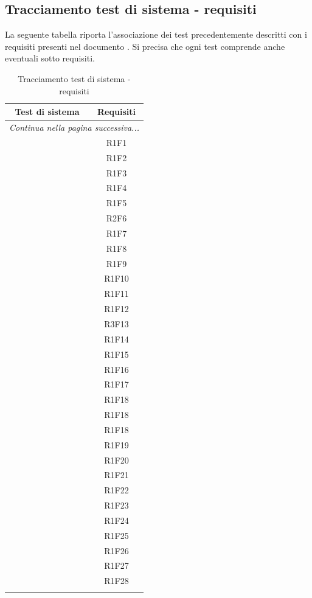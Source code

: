 \subsection{Tracciamento test di sistema - requisiti}
La seguente tabella riporta l'associazione dei test precedentemente descritti con i requisiti presenti nel documento . Si precisa che ogni test comprende anche eventuali sotto requisiti.
\resetCTS
\begin{center}
	\begin{longtable}{|c|c|}
	\hline
	\rowcolor{lighter-grayer}
	\textbf{Test di sistema} & \textbf{Requisiti} \\
	\hline
	\endfirsthead
	\hline
	\multicolumn{2}{|c|}{\textit{Continua nella pagina successiva...}} \\
	\hline
	\endfoot
	\endlastfoot

	\hline
	 & R1F1 \\
	 & R1F2 \\
	 & R1F3 \\
	 & R1F4 \\
	 & R1F5 \\
	 & R2F6 \\
	 & R1F7 \\
	 & R1F8 \\
	 & R1F9 \\
	 & R1F10 \\

	 & R1F11  \\
	 & R1F12 \\
	 & R3F13 \\
	 & R1F14 \\
	 & R1F15 \\
	 & R1F16 \\
	 & R1F17 \\
	 & R1F18 \\
	 & R1F18 \\
	 & R1F18 \\

	 & R1F19 \\
	 & R1F20 \\
	 & R1F21 \\
	 & R1F22 \\
	 & R1F23 \\
	 & R1F24 \\
	 & R1F25 \\
	 & R1F26 \\
	 & R1F27 \\
	 & R1F28 \\
	\hline
	\caption{Tracciamento test di sistema - requisiti}
	\end{longtable}
\end{center}



